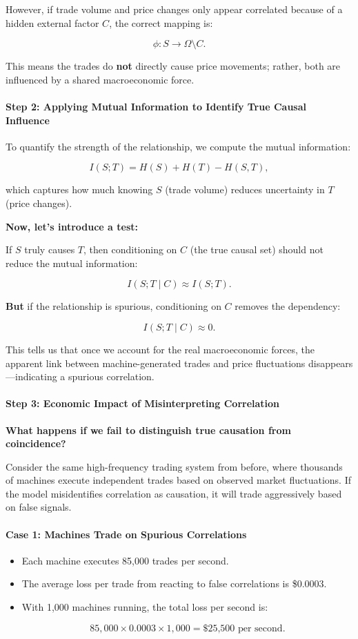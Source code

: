 However, if trade volume and price changes only appear correlated because of a hidden external factor \( C \), the correct mapping is:

\[
\phi: S \to \Omega \setminus C.
\]

This means the trades do \textbf{not} directly cause price movements; rather, both are influenced by a shared macroeconomic force. 

\paragraph{Step 2: Applying Mutual Information to Identify True Causal Influence}

To quantify the strength of the relationship, we compute the mutual information:

\[
I(S; T) = H(S) + H(T) - H(S, T),
\]

which captures how much knowing \( S \) (trade volume) reduces uncertainty in \( T \) (price changes). 

\textbf{Now, let’s introduce a test:}

If \( S \) truly causes \( T \), then conditioning on \( C \) (the true causal set) should not reduce the mutual information:

\[
I(S; T \mid C) \approx I(S; T).
\]

\textbf{But} if the relationship is spurious, conditioning on \( C \) removes the dependency:

\[
I(S; T \mid C) \approx 0.
\]

This tells us that once we account for the real macroeconomic forces, the apparent link between machine-generated trades and price fluctuations disappears—indicating a spurious correlation.

\paragraph{Step 3: Economic Impact of Misinterpreting Correlation}

\textbf{What happens if we fail to distinguish true causation from coincidence?}

Consider the same high-frequency trading system from before, where thousands of machines execute independent trades based on observed market fluctuations. If the model misidentifies correlation as causation, it will trade aggressively based on false signals. 

\paragraph{Case 1: Machines Trade on Spurious Correlations}
\begin{itemize}
    \item Each machine executes 85,000 trades per second.
    \item The average loss per trade from reacting to false correlations is \$0.0003.
    \item With 1,000 machines running, the total loss per second is:

    \[
    85,000 \times 0.0003 \times 1,000 = \text{\$25,500 per second}.
    \]

\end{itemize}

